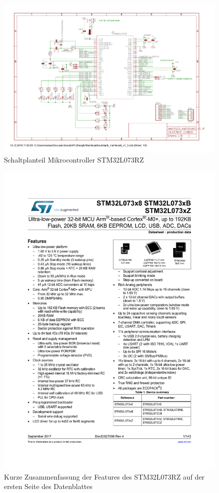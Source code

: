 \documentclass[a4paper]{scrartcl}
\begin{document}
\begin{figure}[H]\centering
\includegraphics[page=1, angle=90, width=\linewidth]{../eagle/Mainboard/watchplb_mainboard_v1_0.pdf}
\caption{Schaltplanteil Mikrocontroller STM32L073RZ}
\end{figure}

\begin{figure}[H]\centering
\includegraphics[page=1, angle=0, width=\linewidth]{../Datasheets/stm32l073rz.pdf}
\caption{Kurze Zusammenfassung der Features des STM32L073RZ auf der ersten Seite des Datenblattes}
\end{figure}
\end{document}
